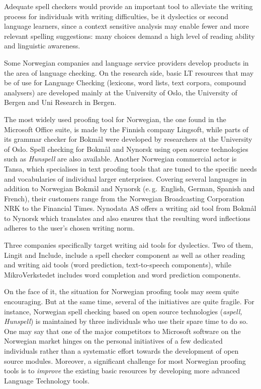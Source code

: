 \begin{multicols}{2}

Adequate spell checkers would provide an important tool to alleviate the writing process for individuals with writing difficulties, be it dyslectics or second language learners, since a context sensitive analysis may enable fewer and more relevant spelling suggestions: many choices demand a high level of reading ability and linguistic awareness.

Some Norwegian companies and language service providers develop products in the area of language checking. 
On the research side, basic LT resources that may be of use for Language Checking (lexicons, word lists, text corpora, compound analysers) are developed mainly at the University of Oslo, the University of Bergen and Uni Research in Bergen. 

The most widely used proofing tool for Norwegian, the one found in the Microsoft Office suite, is made by the Finnish company Lingsoft, while parts of its grammar checker for Bokmål were developed by researchers at the University of Oslo. 
Spell checking for Bokmål and Nynorsk using open source technologies such as \textit{Hunspell} are also available.
Another Norwegian commercial actor is Tansa, which specialises in text proofing tools that are tuned to the specific needs and vocabularies of individual larger enterprises. 
Covering several languages in addition to Norwegian Bokmål and Nynorsk (e.\,g.~English, German, Spanish and French), their customers range from the Norwegian Broadcasting Corporation NRK to the Financial Times. 
Nynodata AS offers a writing aid tool from Bokmål to Nynorsk which translates and also ensures that the resulting word inflections adheres to the user’s chosen writing norm.

Three companies specifically target writing aid tools for dyslectics. 
Two of them, Lingit and Include, include a spell checker component as well as other reading and writing aid tools (word prediction, text-to-speech components), while MikroVerkstedet includes word completion and word prediction components.

On the face of it, the situation for Norwegian proofing tools may seem quite encouraging. 
But at the same time, several of the initiatives are quite fragile. 
For instance, Norwegian spell checking based on open source technologies (\textit{aspell, Hunspell}) is maintained by three individuals who use their spare time to do so. 
One may say that one of the major competitors to Microsoft software on the Norwegian market hinges on the personal initiatives of a few dedicated individuals rather than a systematic effort towards the development of open source modules. Moreover, a significant challenge for most Norwegian proofing tools is to \textit{improve} the existing basic resources by developing more advanced Language Technology tools. 


\end{multicols}
